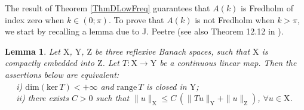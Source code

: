 \documentclass[11pt,a4paper]{report}
\newcommand{\mrm}[1]{\mathrm{#1}}
\newcommand{\mX}{\mrm{X}}
\newcommand{\mY}{\mrm{Y}}
\newcommand{\mZ}{\mrm{Z}}
\renewcommand{\ker}{\mrm{ker}}
\renewcommand{\dim}{\mrm{dim}}
\newtheorem{lemma}[theorem]{Lemma}
\begin{document}
\noindent The result of Theorem \ref{ThmDLowFreq} guarantees that $A(k)$ is Fredholm of index zero when $k\in(0;\pi)$. To prove that $A(k)$ is not Fredholm when $k>\pi$, we start by recalling a lemma due to  J. Peetre \cite{Peet61} (see also Theorem 12.12 in \cite{Wlok87}).
\begin{lemma}\label{lemme Peetre}
Let $\mX$, $\mY$, $\mZ$ be three reflexive Banach spaces, such that $\mX$ is compactly embedded into $\mZ$. Let
$T:\mX\to \mY$ be a continuous linear map. Then the assertions below are equivalent:\\[6pt]
\phantom{i}\quad ~ \hspace{1.2cm}~\phantom{i}i) $\dim(\ker\,T)<+\infty$ and $\mrm{range}\,T$ is closed in $\mY$;\\[5pt]
\phantom{i}\quad ~ \hspace{1.2cm}~ii) there exists $C>0$ such that $\|u\|_{\mX}\le C\,(\|Tu\|_{\mY}+\|u\|_{\mZ})$, $\forall u\in \mX$.
\end{lemma}
\end{document}
